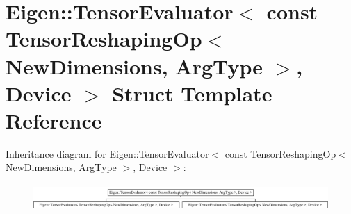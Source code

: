 \hypertarget{struct_eigen_1_1_tensor_evaluator_3_01const_01_tensor_reshaping_op_3_01_new_dimensions_00_01_arg_type_01_4_00_01_device_01_4}{}\section{Eigen\+:\+:Tensor\+Evaluator$<$ const Tensor\+Reshaping\+Op$<$ New\+Dimensions, Arg\+Type $>$, Device $>$ Struct Template Reference}
\label{struct_eigen_1_1_tensor_evaluator_3_01const_01_tensor_reshaping_op_3_01_new_dimensions_00_01_arg_type_01_4_00_01_device_01_4}
Inheritance diagram for Eigen\+:\+:Tensor\+Evaluator$<$ const Tensor\+Reshaping\+Op$<$ New\+Dimensions, Arg\+Type $>$, Device $>$\+:\begin{figure}[H]
\begin{center}
\leavevmode
\includegraphics[height=1.027523cm]{struct_eigen_1_1_tensor_evaluator_3_01const_01_tensor_reshaping_op_3_01_new_dimensions_00_01_arg_type_01_4_00_01_device_01_4}
\end{center}
\end{figure}
